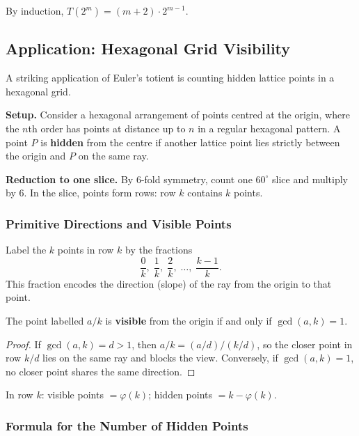 \begin{remark}
By induction, $T(2^m) = (m+2)\cdot 2^{m-1}$.
\end{remark}

\subsection{Application: Hexagonal Grid Visibility}

A striking application of Euler's totient is counting hidden lattice points in a hexagonal grid.

\textbf{Setup.} Consider a hexagonal arrangement of points centred at the origin, where the $n$th order has points at distance up to $n$ in a regular hexagonal pattern. A point $P$ is \textbf{hidden} from the centre if another lattice point lies strictly between the origin and $P$ on the same ray.

\textbf{Reduction to one slice.} By 6-fold symmetry, count one $60^\circ$ slice and multiply by 6. In the slice, points form rows: row $k$ contains $k$ points.

\subsubsection*{Primitive Directions and Visible Points}

Label the $k$ points in row $k$ by the fractions
\[
\frac{0}{k},\; \frac{1}{k},\; \frac{2}{k},\; \ldots,\; \frac{k-1}{k}.
\]
This fraction encodes the direction (slope) of the ray from the origin to that point.

\begin{theorem}
The point labelled $a/k$ is \textbf{visible} from the origin if and only if $\gcd(a,k) = 1$.
\end{theorem}
\begin{proof}
If $\gcd(a,k) = d > 1$, then $a/k = (a/d)/(k/d)$, so the closer point in row $k/d$ lies on the same ray and blocks the view. Conversely, if $\gcd(a,k) = 1$, no closer point shares the same direction.
\end{proof}

\begin{corollary}
In row $k$: visible points $= \varphi(k)$; hidden points $= k - \varphi(k)$.
\end{corollary}

\subsubsection*{Formula for the Number of Hidden Points}

